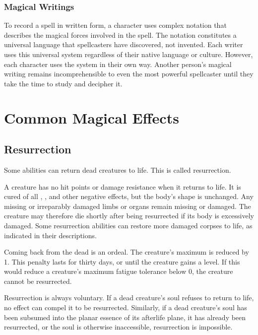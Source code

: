         \subsubsection{Magical Writings}
            To record a spell in written form, a character uses complex notation that describes the magical forces involved in the spell.
            The notation constitutes a universal language that spellcasters have discovered, not invented.
            Each writer uses this universal system regardless of their native language or culture.
            However, each character uses the system in their own way.
            Another person's magical writing remains incomprehensible to even the most powerful spellcaster until they take the time to study and decipher it.

\section{Common Magical Effects}
    \subsection{Resurrection}\label{Resurrection}
        Some abilities can return dead creatures to life.
        This is called resurrection.

        A creature has no hit points or damage resistance when it returns to life.
        It is cured of all , , and other negative effects, but the body's shape is unchanged.
        Any missing or irreparably damaged limbs or organs remain missing or damaged.
        The creature may therefore die shortly after being resurrected if its body is excessively damaged.
        Some resurrection abilities can restore more damaged corpses to life, as indicated in their descriptions.

        Coming back from the dead is an ordeal.
        The creature's maximum  is reduced by 1.
        This penalty lasts for thirty days, or until the creature gains a level.
        If this would reduce a creature's maximum fatigue tolerance below 0, the creature cannot be resurrected.

        Resurrection is always voluntary.
        If a dead creature's soul refuses to return to life, no effect can compel it to be resurrected.
        Similarly, if a dead creature's soul has been subsumed into the planar essence of its afterlife plane, it has already been resurrected, or the soul is otherwise inaccessible, resurrection is impossible.

